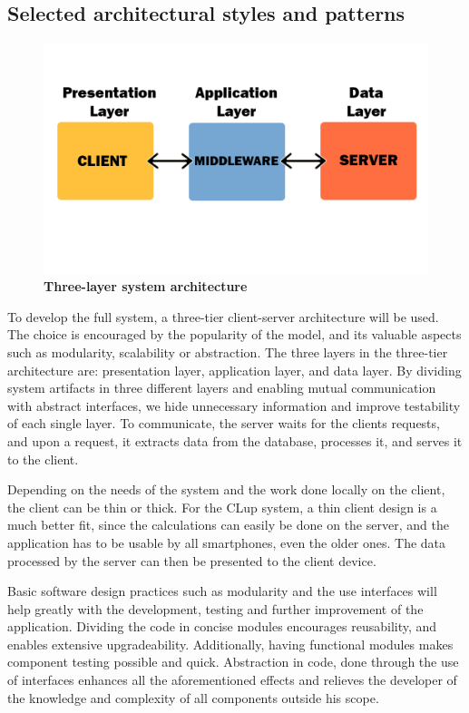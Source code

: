 \newpage
\subsection{Selected architectural styles and patterns}

\begin{figure}[!h]
\centering
\includegraphics[width=\textwidth]{Images/ThreeLayers}
\caption{\label{fig:arch}\textbf{Three-layer system architecture}}
\end{figure}

To develop the full system, a three-tier client-server architecture will be used.  The choice is encouraged by the popularity of the model, and its valuable aspects such as modularity, scalability or abstraction. The three layers in the three-tier architecture are: presentation layer, application layer, and data layer. By dividing system artifacts in three different layers and enabling mutual communication with abstract interfaces, we hide unnecessary information and improve testability of each single layer. To communicate, the server waits for the clients requests, and upon a request, it extracts data from the database, processes it, and serves it to the client.  

Depending on the needs of the system and the work done locally on the client, the client can be thin or thick. For the CLup system, a thin client design is a much better fit, since the calculations can easily be done on the server, and the application has to be usable by all smartphones, even the older ones. The data processed by the server can then be presented to the client device. \newline

Basic software design practices such as modularity and the use interfaces will help greatly with the development, testing and further improvement of the application. Dividing the code in concise modules encourages reusability, and enables extensive upgradeability. Additionally, having functional modules makes component testing possible and quick. Abstraction in code, done through the use of interfaces enhances all the aforementioned effects and relieves the developer of the knowledge and complexity of all components outside his scope. \newline

